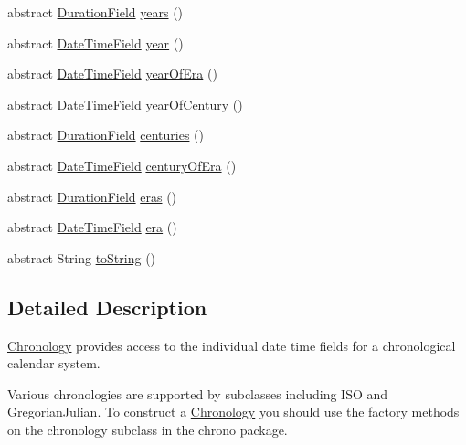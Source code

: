 \begin{DoxyCompactItemize}
\item 
abstract \hyperlink{classorg_1_1joda_1_1time_1_1_duration_field}{Duration\-Field} \hyperlink{classorg_1_1joda_1_1time_1_1_chronology_a7b1adf5c441b0a4da0463f192f2c78ca}{years} ()
\item 
abstract \hyperlink{classorg_1_1joda_1_1time_1_1_date_time_field}{Date\-Time\-Field} \hyperlink{classorg_1_1joda_1_1time_1_1_chronology_a38f8da7b9552802bdb402352b57a7844}{year} ()
\item 
abstract \hyperlink{classorg_1_1joda_1_1time_1_1_date_time_field}{Date\-Time\-Field} \hyperlink{classorg_1_1joda_1_1time_1_1_chronology_ac2424ba626f6203a14294ab1cc7239c8}{year\-Of\-Era} ()
\item 
abstract \hyperlink{classorg_1_1joda_1_1time_1_1_date_time_field}{Date\-Time\-Field} \hyperlink{classorg_1_1joda_1_1time_1_1_chronology_ad66ce076eeaec4869820260be5276eec}{year\-Of\-Century} ()
\item 
abstract \hyperlink{classorg_1_1joda_1_1time_1_1_duration_field}{Duration\-Field} \hyperlink{classorg_1_1joda_1_1time_1_1_chronology_ab210d7b09caa8195b0a26f1651ef1533}{centuries} ()
\item 
abstract \hyperlink{classorg_1_1joda_1_1time_1_1_date_time_field}{Date\-Time\-Field} \hyperlink{classorg_1_1joda_1_1time_1_1_chronology_acfcc5ff5d83f836ffe116a1e1016f04d}{century\-Of\-Era} ()
\item 
abstract \hyperlink{classorg_1_1joda_1_1time_1_1_duration_field}{Duration\-Field} \hyperlink{classorg_1_1joda_1_1time_1_1_chronology_a3874954d2abef4f7e258a5d55732bd49}{eras} ()
\item 
abstract \hyperlink{classorg_1_1joda_1_1time_1_1_date_time_field}{Date\-Time\-Field} \hyperlink{classorg_1_1joda_1_1time_1_1_chronology_a4d471401e54ddf2fd1c4e42606a8a922}{era} ()
\item 
abstract String \hyperlink{classorg_1_1joda_1_1time_1_1_chronology_af07d7d0ed13bcfca246e57768076de26}{to\-String} ()
\end{DoxyCompactItemize}


\subsection{Detailed Description}
\hyperlink{classorg_1_1joda_1_1time_1_1_chronology}{Chronology} provides access to the individual date time fields for a chronological calendar system. 

Various chronologies are supported by subclasses including I\-S\-O and Gregorian\-Julian. To construct a \hyperlink{classorg_1_1joda_1_1time_1_1_chronology}{Chronology} you should use the factory methods on the chronology subclass in the chrono package. 

